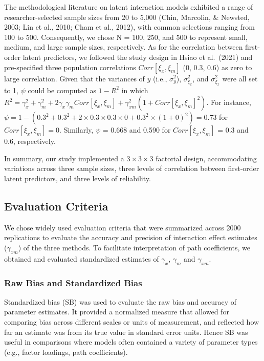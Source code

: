\documentclass[
  man]{apa6}
\begin{document}
The methodological literature on latent interaction models exhibited a range of researcher-selected sample sizes from 20 to 5,000 (Chin, Marcolin, \& Newsted, 2003; Lin et al., 2010; Cham et al., 2012), with common selections ranging from 100 to 500. Consequently, we chose N = 100, 250, and 500 to represent small, medium, and large sample sizes, respectively. As for the correlation between first-order latent predictors, we followed the study design in Hsiao et al.~(2021) and pre-specified three population correlations \(Corr[{\xi_{x},\xi_{m}}]\) (0, 0.3, 0.6) as zero to large correlation. Given that the variances of \(y\) (i.e., \(\sigma_{y}^2\)), \(\sigma_{\xi_{x}}^2\), and \(\sigma_{\xi_{x}}^2\) were all set to 1, \(\psi\) could be computed as \(1 - R^2\) in which \(R^2 = \gamma_{x}^2 + \gamma_{m}^2 + 2\gamma_{x}\gamma_{m}Corr[{\xi_{x},\xi_{m}}] + \gamma_{xm}^2(1 + Corr[{\xi_{x},\xi_{m}}]^2)\). For instance, \(\psi = 1 - (0.3^2 + 0.3^2 + 2\times0.3\times0.3\times0 + 0.3^2\times(1 + 0)^2) = 0.73\) for \(Corr[{\xi_{x},\xi_{m}}] = 0\). Similarly, \(\psi\) = 0.668 and 0.590 for \(Corr[{\xi_{x},\xi_{m}}]\) = 0.3 and 0.6, respectively.

In summary, our study implemented a \(3 \times 3 \times 3\) factorial design, accommodating variations across three sample sizes, three levels of correlation between first-order latent predictors, and three levels of reliability.

\hypertarget{evaluation-criteria}{%
\subsection{Evaluation Criteria}\label{evaluation-criteria}}

We chose widely used evaluation criteria that were summarized across 2000 replications to evaluate the accuracy and precision of interaction effect estimates (\(\gamma_{xm}\)) of the three methods. To facilitate interpretation of path coefficients, we obtained and evaluated standardized estimates of \(\gamma_{x}\), \(\gamma_{m}\) and \(\gamma_{xm}\).

\hypertarget{raw-bias-and-standardized-bias}{%
\subsubsection{Raw Bias and Standardized Bias}\label{raw-bias-and-standardized-bias}}

Standardized bias (SB) was used to evaluate the raw bias and accuracy of parameter estimates. It provided a normalized measure that allowed for comparing bias across different scales or units of measurement, and reflected how far an estimate was from its true value in standard error units. Hence SB was useful in comparisons where models often contained a variety of parameter types (e.g., factor loadings, path coefficients).
\end{document}
